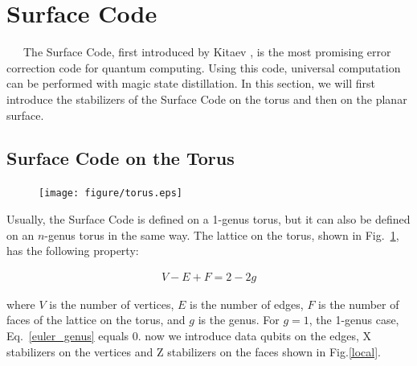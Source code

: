 \documentclass[a4paper,11pt]{ltjsarticle}
\begin{document}
\section{Surface Code}{
    \ \ \ The Surface Code, first introduced by Kitaev \cite{kitaev1997}, is the most promising error correction code for quantum computing. Using this code, universal computation can be performed with magic state distillation. In this section, we will first introduce the stabilizers of the Surface Code on the torus and then on the planar surface.

    \subsection{Surface Code on the Torus}{

        \begin{figure}[h]
            \centering
            \texttt{[image: figure/torus.eps]}
            \vspace{0pt}\caption{}
            \label{torus}
            \vspace{-15pt}
        \end{figure}

        Usually, the Surface Code is defined on a 1-genus torus, but it can also be defined on an $n$-genus torus in the same way. The lattice on the torus, shown in Fig.~\ref{torus}, has the following property:

        \begin{align}\label{euler_genus}
            V-E+F=2-2g
        \end{align}
        
        where $V$ is the number of vertices, $E$ is the number of edges, $F$ is the number of faces of the lattice on the torus, and $g$ is the genus. For $g = 1$, the 1-genus case, Eq.~\ref{euler_genus} equals $0$. now we introduce data qubits on the edges, X stabilizers on the vertices and Z stabilizers on the faces shown in Fig.\ref{local}.

        \clearpage

}}
\end{document}

